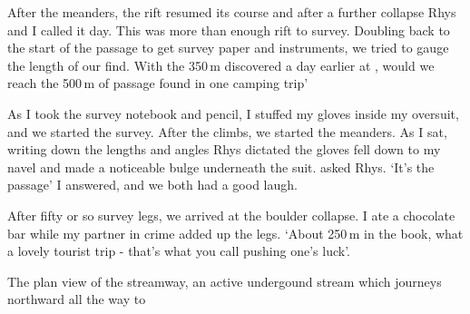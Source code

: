 After the meanders, the rift resumed its course and after a further collapse Rhys and I called it day. This was more than enough rift to survey. Doubling back to the start of the passage to get survey paper and instruments, we tried to gauge the length of our find. With the 350\,m discovered a day earlier at , would we reach the 500\,m of passage found in one camping trip'


As I took the survey notebook and pencil, I stuffed my gloves inside my oversuit, and we started the survey. After the climbs, we started the meanders. As I sat, writing down the lengths and angles Rhys dictated the gloves fell down to my navel and made a noticeable bulge underneath the suit.
 asked Rhys.
`It's the passage' I answered, and we both had a good laugh.

After fifty or so survey legs, we arrived at the boulder collapse. I ate a chocolate bar while my partner in crime added up the legs. `About 250\,m in the book, what a lovely tourist trip - that's what you call pushing one's luck'.


\begin{survey}[b!]
\checkoddpage \ifoddpage \forcerectofloat \else \forceversofloat \fi
\centering
{}
\caption{The plan view of the \protect{} streamway, an active undergound stream which journeys northward all the way to \protect{} }
\label{map:pushyourluck}
\end{survey}
